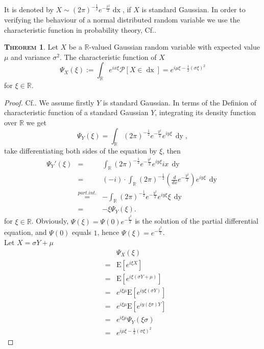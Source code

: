 \documentclass[a4paper, twoside, 11pt]{article}
\theoremstyle{definition}
\newtheorem{theorem}[definition]{\scshape Theorem}
\newcommand{\sqbr}[1]{\left[ {#1} \right]}
\begin{document}
It is denoted by $X \sim (2\pi)^{-\frac{1}{2}}e^{-\frac{x^2}{2}}\mathop{dx} $, if $X$ is standard Gaussian. In order to verifying the behaviour of a normal distributed random variable we use the characteristic function in probability theory, Cf.\cite{bauer}. 

\begin{theorem}
  Let $X$ be a $\mathbb{R}$-valued Gaussian random variable with expected value $\mu$ and variance $\sigma^2$. The characteristic function of $X$
\begin{equation}
  \Psi_X(\xi) := \int_\mathbb{R} e^{ix\xi}\mathcal{P}\sqbr{X \in \mathop{dx}} = e^{i\mu\xi-\frac{1}{2}(\sigma\xi)^2}
  \label{sec:cht}
\end{equation}
for $\xi \in \mathbb{R}$.
\label{sec:char}
\end{theorem}
\begin{proof}
  Cf.\cite{shilling}. We assume firstly $Y$ is standard Gaussian. In terms of the Definion of characteristic function of a standard Gaussian $Y$, integrating its density function over $\mathbb{R}$ we get
  \begin{equation*}
	\Psi_Y(\xi) = \int_\mathbb{R} (2\pi)^{-\frac{1}{2}}e^{-\frac{y^2}{2}}e^{iy\xi}\,\mathop{dy},
  \end{equation*}
take differentiating both sides of the equation by $\xi$, then
\begin{eqnarray*}
\Psi_Y'(\xi) &=& \int_\mathbb{R}(2\pi)^{-\frac{1}{2}}e^{-\frac{y^2}{2}}e^{iy\xi}ix\,\mathop{dy}\\
             &=& (-i)\cdot\int_\mathbb{R} (2\pi)^{-\frac{1}{2}}(\frac{d}{dx}e^{-\frac{y^2}{2}})e^{iy\xi}\,\mathop{dy}\\
			 &\overset{part.int.}{=}& -\int_\mathbb{R}(2\pi)^{-\frac{1}{2}}e^{-\frac{y^2}{2}}e^{iy\xi}\xi\,\mathop{dy}\\
			 &=& -\xi\Psi_Y(\xi).
\end{eqnarray*}
for $\xi \in \mathbb{R}$. Obviously, 
$\Psi(\xi) = \Psi(0)e^{-\frac{\xi^2}{2}}$ is the solution of the partial differential equation, and $\Psi(0)$ equals $1$, hence $\Psi(\xi) = e^{-\frac{\xi^2}{2}}$.\\
Let $X =\sigma Y + \mu$
\begin{eqnarray*}
  && \Psi_X(\xi)\\
  &=& \mathrm{E}[e^{i\xi X}]\\
  &=& \mathrm{E}[e^{i\xi (\sigma Y + \mu) }]\\
  &=& e^{i\xi\mu} \mathrm{E}[e^{iy\xi (\sigma Y)}]\\
  &=& e^{i\xi\mu} \mathrm{E}[e^{iy (\xi \sigma) Y}]\\
  &=& e^{i\xi\mu} \Psi_Y(\xi\sigma)\\
  &=& e^{i\mu\xi-\frac{1}{2}(\sigma\xi)^2}
\end{eqnarray*}
\end{proof}
\end{document}
